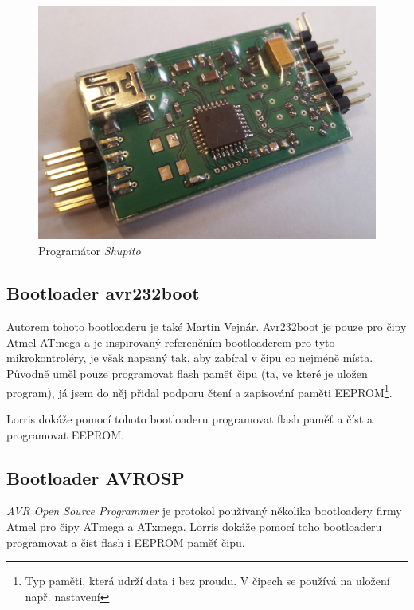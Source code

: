 \documentclass[12pt, a4paper, oneside]{article}
\newcommand{\It}{\textit}  %
\begin{document}
\begin{figure}[H]
\begin{center}
\includegraphics[width=\textwidth]{img/shupito_promo.jpg}
\caption{Programátor \It{Shupito}}
\label{prog_mini}
\end{center}
\end{figure}

\subsection{Bootloader avr232boot}
Autorem tohoto bootloaderu je také Martin Vejnár. Avr232boot je pouze pro čipy Atmel ATmega a je inspirovaný referenčním bootloaderem pro tyto mikrokontroléry, je však napsaný tak, aby zabíral v čipu co nejméně místa. Původně uměl pouze programovat flash paměť čipu (ta, ve které je uložen program), já jsem do něj přidal podporu čtení a zapisování paměti EEPROM\footnote{Typ paměti, která udrží data i bez proudu. V čipech se používá na uložení např. nastavení}.

Lorris dokáže pomocí tohoto bootloaderu programovat flash paměť a číst a programovat EEPROM.

\subsection{Bootloader AVROSP}
\It{AVR Open Source Programmer} je protokol používaný několika bootloadery firmy Atmel pro čipy ATmega a ATxmega. Lorris dokáže pomocí toho bootloaderu programovat a číst flash i EEPROM paměť čipu.


\newpage
\end{document}
